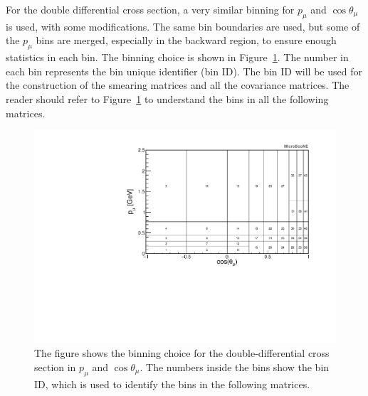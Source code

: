 For the double differential cross section, a very similar binning for $p_\mu$ and $\cos\theta_\mu$ is used, with some modifications. The same bin boundaries are used, but some of the $p_\mu$ bins are merged, especially in the backward region, to ensure enough statistics in each bin. The binning choice is shown in Figure~\ref{fig:polybins}. The number in each bin represents the bin unique identifier (bin ID). The bin ID will be used for the construction of the smearing matrices and all the covariance matrices. The reader should refer to Figure~\ref{fig:polybins} to understand the bins in all the following matrices.


\begin{figure}[]
\centering
\includegraphics[width=.89\textwidth]{images/BinningPolyBin/bin_numbers}
\caption[Binning for the Double-Differential Cross Section]{The figure shows the binning choice for the double-differential cross section in $p_\mu$ and $\cos\theta_\mu$. The numbers inside the bins show the bin ID, which is used to identify the bins in the following matrices.}
\label{fig:polybins}
\end{figure}








